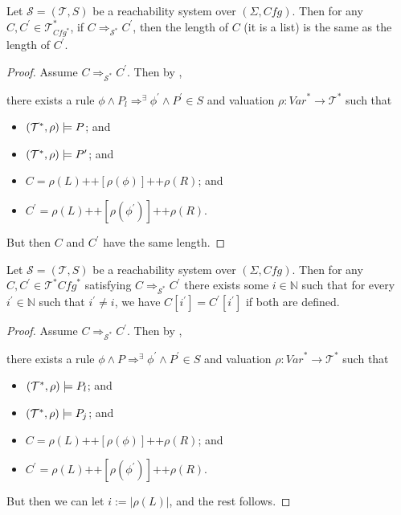 \begin{lemma}\label{lem:transitionOnlyBetweenListsOfSameLength}
    Let $\mathcal{S} = (\mathcal{T}, S)$ be a reachability system over $(\Sigma, \mathit{Cfg})$.
    Then for any $C,C^\prime \in \mathcal{T}^*_{\mathit{Cfg}^*}$,
    if $C \Rightarrow_{\mathcal{S}^*} C^\prime$,
    then the length of $C$ (it is a list) is the same as the length of $C^\prime$.
\end{lemma}
\begin{proof}
Assume $C \Rightarrow_{\mathcal{S}^*} C^\prime$.
Then by ,
\begin{proofenv}
    there exists a rule $\phi \land P_l \Rightarrow^\exists \phi^\prime \land P^\prime \in S$
    and valuation $\rho : \mathit{Var}^* \to \mathcal{T}^*$ such that
    \begin{itemize}
        \item $(\mathcal{T}^*, \rho) \models P$; and
        \item $(\mathcal{T}^*, \rho) \models P^\prime$; and
        \item $C = \rho(L) \texttt{++} [\rho(\phi)] \texttt{++} \rho(R)$; and
        \item $C^\prime = \rho(L) \texttt{++} [\rho(\phi^\prime)] 
        \texttt{++} \rho(R)$.
    \end{itemize}
\end{proofenv}
But then $C$ and $C^\prime$ have the same length.
\end{proof}

\begin{lemma}\label{lem:atMostOneComponentChanges}
    Let $\mathcal{S} = (\mathcal{T}, S)$ be a reachability system over $(\Sigma, \mathit{Cfg})$.
    Then for any $C,C^\prime \in \mathcal{T}^*{\mathit{Cfg}^*}$ satisfying $C \Rightarrow_{\mathcal{S}^*} C^\prime$
    there exists some $i \in \mathbb{N}$ such that
    for every $i^\prime \in \mathbb{N}$ such that $i^\prime \not = i$,
    we have $C[i^\prime] = C^\prime[i^\prime]$ if both are defined.
\end{lemma}
\begin{proof}
Assume $C \Rightarrow_{\mathcal{S}^*} C^\prime$.
Then by ,
\begin{proofenv}
    there exists a rule $\phi \land P \Rightarrow^\exists \phi^\prime \land P^\prime \in S$
    and valuation $\rho : \mathit{Var}^* \to \mathcal{T}^*$ such that
    \begin{itemize}
        \item $(\mathcal{T}^*, \rho) \models P_l$; and
        \item $(\mathcal{T}^*, \rho) \models P_j$; and
        \item $C = \rho(L) \texttt{++} [\rho(\phi)] \texttt{++} \rho(R)$; and
        \item $C^\prime = \rho(L) \texttt{++} [\rho(\phi^\prime)] 
        \texttt{++} \rho(R)$.
    \end{itemize}
\end{proofenv}
But then we can let $i := |\rho(L)|$, and the rest follows.
\end{proof}


